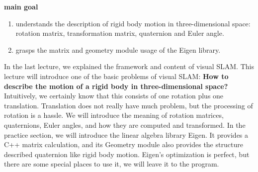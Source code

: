 \begin{mdframed}
	\textbf{main goal}
	\begin{enumerate}
		\item understands the description of rigid body motion in three-dimensional space: rotation matrix, transformation matrix, quaternion and Euler angle.
		\item grasps the matrix and geometry module usage of the Eigen library.
	\end{enumerate}
\end{mdframed}

In the last lecture, we explained the framework and content of visual SLAM. This lecture will introduce one of the basic problems of visual SLAM: \textbf{ How to describe the motion of a rigid body in three-dimensional space? }
Intuitively, we certainly know that this consists of one rotation plus one translation.
Translation does not really have much problem, but the processing of rotation is a hassle.
We will introduce the meaning of rotation matrices, quaternions, Euler angles, and how they are computed and transformed. In the practice section, we will introduce the linear algebra library Eigen. It provides a C++ matrix calculation, and its Geometry module also provides the structure described quaternion like rigid body motion.
Eigen's optimization is perfect, but there are some special places to use it, we will leave it to the program.